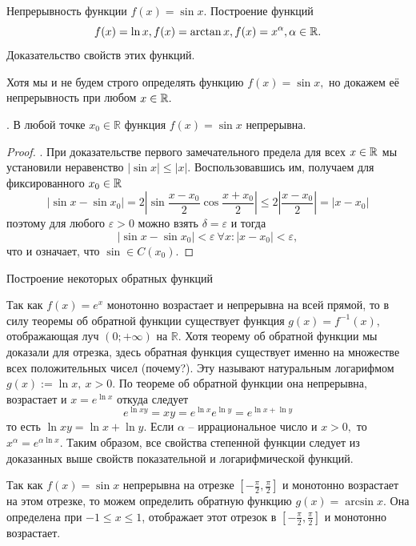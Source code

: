 \newpage

\begin{problem}
Непрерывность функции $f(x) = \sin x$. Построение функций
\begin{equation}
    f(x) = \ln x, f(x) = \arctan x, f(x) = x^\alpha, \alpha \in \mathbb{R}.
\end{equation}
Доказательство свойств этих функций.
\end{problem}

Хотя мы и не будем строго определять
функцию $f(x)=\sin x,$ но докажем её непрерывность
при любом $x\in\mathbb{R}.$
\begin{proposition}.
    В любой точке
    $x_0 \in \mathbb R$ функция $f(x)=\sin x$ непрерывна.
\end{proposition}
\begin{proof}.
    При доказательстве первого замечательного предела
    для всех $x\in\mathbb{R}$ мы установили неравенство
    $|\sin x| \leq |x|.$
    Воспользовавшись им, получаем для фиксированного
    $x_0\in\mathbb{R}$
    $$
        |\sin x - \sin x_0| = 2|\sin\frac{x-x_0}{2}
        \cos\frac{x+x_0}{2}| \leq 2 |\frac{x - x_0}{2}|
        = |x-x_0|
    $$
    поэтому для любого
    $\varepsilon > 0$ можно взять
    $\delta = \varepsilon$ и тогда
    $$
        |\sin x - \sin x_0| < \varepsilon \ \forall x:
        |x-x_0| < \varepsilon,
    $$
    что и означает, что
    $\sin \in C(x_0)$.
\end{proof}


\begin{center}
    \textsf{Построение некоторых обратных функций}
\end{center}

Так как $f(x)=e^x$ монотонно возрастает и непрерывна
на всей прямой, то в силу теоремы об обратной
функции существует функция $g(x)=f^{-1}(x),$
отображающая луч $(0; +\infty)$ на $\mathbb R$.
Хотя теорему об обратной функции
мы доказали для отрезка, здесь обратная
функция существует именно на множестве
всех положительных чисел (почему?).
Эту называют натуральным логарифмом
$g(x) := \ln x, \ x>0$. По теореме об обратной
функции она непрерывна, возрастает и
$x = e^{\ln x}$ откуда следует
$$
    e^{\ln xy} = xy = e^{\ln x} e^{\ln y} = e^{\ln x+\ln y}
$$
то есть $\ln xy = \ln x + \ln y.$
Если $\alpha$ -- иррациональное число и $x>0,$
то $x^\alpha = e^{\alpha \ln x}.$
Таким образом, все свойства степенной
функции следует из доказанных
выше свойств показательной и логарифмической функций.

Так как $f(x)=\sin x$ непрерывна на отрезке
$[-\frac{\pi}{2}, \frac{\pi}{2}]$ и
монотонно возрастает на этом отрезке,
то можем определить обратную
функцию $g(x) = \arcsin x$. Она определена при
$-1 \leq x \leq 1$, отображает этот отрезок в
$[-\frac{\pi}{2}, \frac{\pi}{2}]$ и монотонно возрастает.

